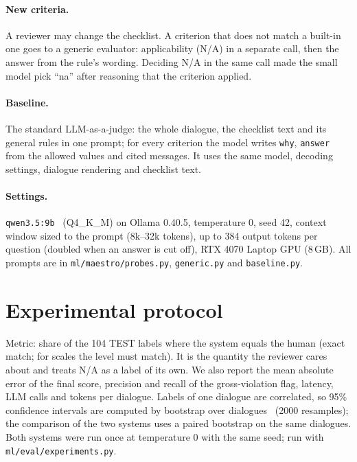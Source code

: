 \documentclass[11pt,a4paper]{article}
\begin{document}
\paragraph{New criteria.} A reviewer may change the checklist. A criterion that does not match a built-in one
goes to a generic evaluator: applicability (N/A) in a separate call, then the answer from the rule's wording.
Deciding N/A in the same call made the small model pick ``na'' after reasoning that the criterion applied.

\paragraph{Baseline.} The standard LLM-as-a-judge: the whole dialogue, the checklist text and its general
rules in one prompt; for every criterion the model writes \texttt{why}, \texttt{answer} from the allowed values and
cited messages. It uses the same model, decoding settings, dialogue rendering and checklist text.

\paragraph{Settings.} \texttt{qwen3.5:9b}~\cite{qwen3} (Q4\_K\_M) on Ollama 0.40.5, temperature 0, seed 42,
context window sized to the prompt (8k--32k tokens), up to 384 output tokens per question (doubled when an
answer is cut off), RTX 4070 Laptop GPU (8\,GB). All prompts are in \texttt{ml/maestro/probes.py},
\texttt{generic.py} and \texttt{baseline.py}.

\section{Experimental protocol}
Metric: share of the 104 TEST labels where the system equals the human (exact match; for scales the level
must match). It is the quantity the reviewer cares about and treats N/A as a label of its own. We also report
the mean absolute error of the final score, precision and recall of the gross-violation flag, latency, LLM
calls and tokens per dialogue. Labels of one dialogue are correlated, so 95\% confidence intervals are
computed by bootstrap over dialogues~\cite{efron1993bootstrap} (2000 resamples); the comparison of the two
systems uses a paired bootstrap on the same dialogues. Both systems were run once at temperature 0 with the
same seed; run with \texttt{ml/eval/experiments.py}.
\end{document}
